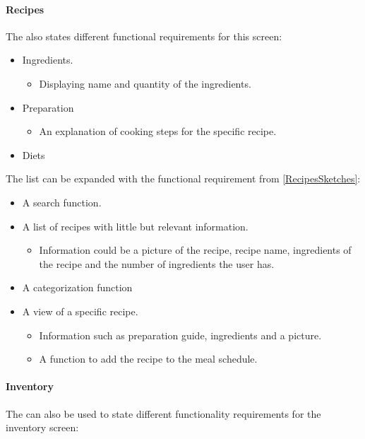 \paragraph{Recipes}
The  also states different functional requirements for this screen:

\begin{itemize}
	\item Ingredients.
		\begin{itemize}
			\item Displaying name and quantity of the ingredients.
		\end{itemize}
	\item Preparation
		\begin{itemize}
			\item An explanation of cooking steps for the specific recipe.
		\end{itemize}
	\item Diets
\end{itemize} 

The list can be expanded with the functional requirement from  \cref{RecipesSketches}:

\begin{itemize}
	\item A search function.
	\item A list of recipes with little but relevant information.
		\begin{itemize}
			\item Information could be a picture of the recipe, recipe name, ingredients of the recipe and the number of ingredients the user has.
		\end{itemize}
	\item A categorization function
	\item A view of a specific recipe.
		\begin{itemize}
			\item Information such as preparation guide, ingredients and a picture.
			\item A function to add the recipe to the meal schedule.
		\end{itemize}
\end{itemize}

\paragraph{Inventory}
The  can also be used to state different functionality requirements for the inventory screen:

